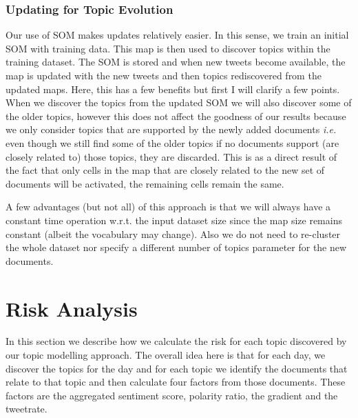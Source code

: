 \documentclass{article}
\begin{document}
\subsubsection{Updating for Topic Evolution}
Our use of SOM makes updates relatively easier. In this sense, we train an initial SOM with training data. This map is then used to discover topics within the training dataset. The SOM is stored and when new tweets become available, the map is updated with the new tweets and then  topics rediscovered from the updated maps. Here, this has a few benefits but first I will clarify a few points. When we discover the topics from the updated SOM we will also discover some of the older topics, however this does not affect the goodness of our results because we only consider topics that are supported by the newly added documents \emph{i.e.} even though we still find some of the older topics if no documents support (are closely related to) those topics, they are discarded. This is as a direct result of the fact that only cells in the map that are closely related to the new set of documents will be activated, the remaining cells remain the same. 

A few advantages (but not all) of this approach is that we will always have a constant time operation w.r.t. the input dataset size since the map size remains constant (albeit the vocabulary may change). Also we do not need to re-cluster the whole dataset nor specify a different number of topics parameter for the new documents.


\section{Risk Analysis}
In this section we describe how we calculate the risk for each topic discovered by  our topic modelling approach. The overall idea here is that for each day, we discover the topics for the day and for each topic we identify the documents that relate to that topic and then calculate four factors from those documents. These factors are the aggregated sentiment score, polarity ratio, the gradient and the tweetrate. 
\end{document}
